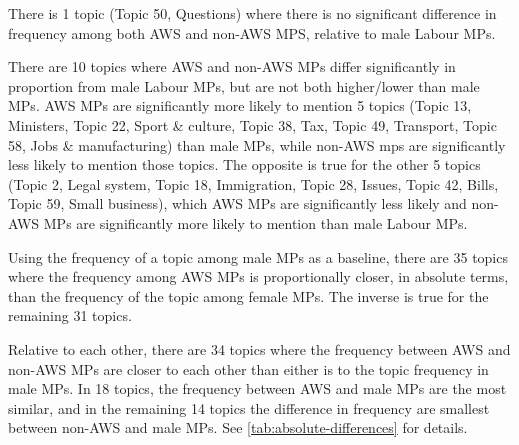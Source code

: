 \documentclass[]{article}
\theoremstyle{definition}
\theoremstyle{definition}
\theoremstyle{definition}
\theoremstyle{remark}
\begin{document}
There is 1 topic (Topic 50, Questions) where there is no significant
difference in frequency among both AWS and non-AWS MPS, relative to male
Labour MPs.

There are 10 topics where AWS and non-AWS MPs differ significantly in
proportion from male Labour MPs, but are not both higher/lower than male
MPs. AWS MPs are significantly more likely to mention 5 topics (Topic
13, Ministers, Topic 22, Sport \& culture, Topic 38, Tax, Topic 49,
Transport, Topic 58, Jobs \& manufacturing) than male MPs, while non-AWS
mps are significantly less likely to mention those topics. The opposite
is true for the other 5 topics (Topic 2, Legal system, Topic 18,
Immigration, Topic 28, Issues, Topic 42, Bills, Topic 59, Small
business), which AWS MPs are significantly less likely and non-AWS MPs
are significantly more likely to mention than male Labour MPs.

Using the frequency of a topic among male MPs as a baseline, there are
35 topics where the frequency among AWS MPs is proportionally closer, in
absolute terms, than the frequency of the topic among female MPs. The
inverse is true for the remaining 31 topics.

Relative to each other, there are 34 topics where the frequency between
AWS and non-AWS MPs are closer to each other than either is to the topic
frequency in male MPs. In 18 topics, the frequency between AWS and male
MPs are the most similar, and in the remaining 14 topics the difference
in frequency are smallest between non-AWS and male MPs. See
\ref{tab:absolute-differences} for details.
\end{document}
